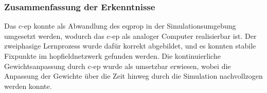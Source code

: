 \subsubsection{Zusammenfassung der Erkenntnisse}

Das \gls{c-ep} konnte als Abwandlung des \gls{eqprop} in der Simulationsumgebung umgesetzt werden, wodurch das \gls{c-ep} als analoger Computer realisierbar ist. Der zweiphasige Lernprozess wurde dafür korrekt abgebildet, und es konnten stabile Fixpunkte im \gls{hopfieldnetzwerk} gefunden werden. Die kontinuierliche Gewichtsanpassung durch \gls{c-ep} wurde als umsetzbar erwiesen, wobei die Anpassung der Gewichte über die Zeit hinweg durch die Simulation nachvollzogen werden konnte.
